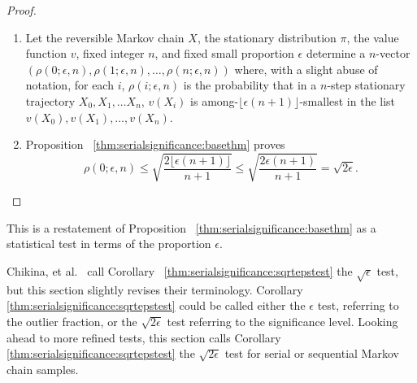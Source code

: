 \documentclass[12pt]{article}
\begin{document}
\begin{proof}
    \begin{enumerate}
        \item
            Let the reversible Markov chain \( X \), the stationary
            distribution \( \pi \), the value function \( v \), fixed
            integer \( n \), and fixed small proportion \( \epsilon \)
            determine a \( n \)-vector \( (\rho(0; \epsilon, n), \rho(1;
            \epsilon, n), \dots, \rho(n; \epsilon, n)) \) where, with a
            slight abuse of notation, for each \( i \), \( \rho(i;
            \epsilon, n) \) is the probability that in a \( n \)-step
            stationary trajectory \( X_0, X_1, \dots X_n \), \( v(X_i) \)
            is among-\( \lfloor \epsilon(n+1) \rfloor \)-smallest in the
            list \( v(X_0), v(X_1), \dots, v(X_n) \).
        \item
            Proposition~%
            \ref{thm:serialsignificance:basethm} proves
            \[
                \rho(0; \epsilon, n) \le \sqrt{\frac{2 \lfloor \epsilon
                (n+1) \rfloor}{n+1}} \le \sqrt{\frac{2 \epsilon (n+1)}{n+1}}
                = \sqrt{2\epsilon}.
            \]
    \end{enumerate}
\end{proof}

\begin{remark}
    This is a restatement of Proposition~%
    \ref{thm:serialsignificance:basethm} as a statistical test in terms
    of the proportion \( \epsilon \).

\end{remark}

\begin{remark}
    Chikina, et al.~%
    \cite{Chikina2860} call Corollary~%
    \ref{thm:serialsignificance:sqrtepstest} the \( \sqrt{\epsilon} \)
    test, but this section slightly revises their terminology.
    Corollary~%
    \ref{thm:serialsignificance:sqrtepstest} could be called either the \(
    \epsilon \) test, referring to the outlier fraction, or the \( \sqrt
    {2 \epsilon} \) test referring to the significance level.  Looking
    ahead to more refined tests, this section calls Corollary~%
    \ref{thm:serialsignificance:sqrtepstest} the \( \sqrt{2 \epsilon} \)
    test for serial or sequential Markov chain samples.
\end{remark}
\end{document}
